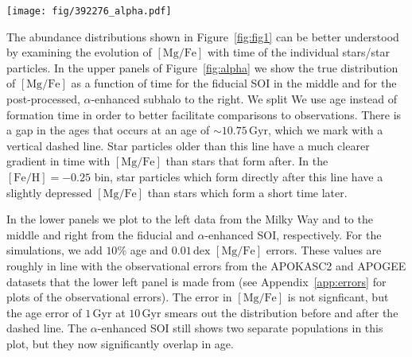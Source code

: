 \documentclass[linenumbers, twocolumn]{aastex631}
\newcommand{\Gyr}{\ensuremath{\textrm{Gyr}}}
\newcommand{\FeH}{\ensuremath{[\textrm{Fe}/\textrm{H}]}}
\newcommand{\MgFe}{\ensuremath{[\textrm{Mg}/\textrm{Fe}]}}
\newcommand{\dex}{\ensuremath{\textrm{dex}}}
\begin{document}
\begin{figure*}
  \centering
  \texttt{[image: fig/392276\_alpha.pdf]}
  \caption{\textbf{Bimodality in the abundance plane is linked to distinct epochs in simulation.} The upper panels show \MgFe{} as a function of age for our subhalo in TNG. The colors indicate stellar populations at fixed values of \FeH{}, which are the same as in Figure~\ref{fig:fig1}. A gap in the relation occurs at an age of approximately $10.75\,\Gyr$, which we indicate with a vertical dashed line. The effect of the $\alpha$-enhancement is clear, as it more clearly separates the stars that form before and after this gap in ages (star particles which formed before $z=1.5$ are $\alpha$-enhanced, which occurs at an age of $\sim9.5\,\Gyr$). The lower panels show on the left the Milky Way and on the center and right the data from TNG but with $10\%$ age errors and $0.01\,\dex$ errors in \MgFe{}. When the simulations are given these errors, we see that the before and after star particles smear such that the two populations significantly overlap in ages. This feature more closely resembles the Milky Way, which displays such populations where the bimodality is strongest -- $\FeH=-0.5$ (blue) and $-0.25$ (orange).}
  \label{fig:alpha}
\end{figure*}

The abundance distributions shown in Figure~\ref{fig:fig1} can be better understood by examining the evolution of \MgFe{} with time of the individual stars/star particles. In the upper panels of Figure~\ref{fig:alpha} we show the true distribution of \MgFe{} as a function of time for the fiducial SOI in the middle and for the post-processed, $\alpha$-enhanced subhalo to the right. We split  We use age instead of formation time in order to better facilitate comparisons to observations. There is a gap in the ages that occurs at an age of  $\sim10.75\,\Gyr$, which we mark with a vertical dashed line. Star particles older than this line have a much clearer gradient in time with \MgFe{} than stars that form after. In the $\FeH=-0.25$ bin, star particles which form directly after this line have a slightly depressed \MgFe{} than stars which form a short time later.

In the lower panels we plot to the left data from the Milky Way and to the middle and right from the fiducial and $\alpha$-enhanced SOI, respectively. For the simulations, we add $10\%$ age and $0.01\,\dex$ \MgFe{} errors. These values are roughly in line with the observational errors from the APOKASC2 and APOGEE datasets that the lower left panel is made from (see Appendix~\ref{app:errors} for plots of the observational errors). The error in \MgFe{} is not signficant, but the age error of $1\,\Gyr$ at $10\,\Gyr$ smears out the distribution before and after the dashed line. The $\alpha$-enhanced SOI still shows two separate populations in this plot, but they now significantly overlap in age.
\end{document}

